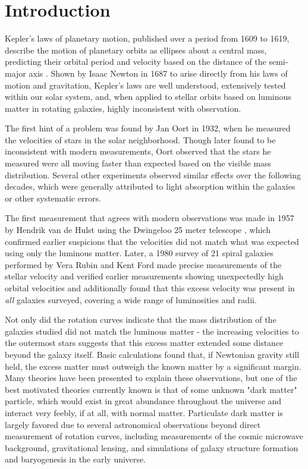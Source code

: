 \chapter{Introduction}
\label{intro_chapter}

Kepler's laws of planetary motion, published over a period from 1609 to 1619, describe the motion of planetary orbits as ellipses about a central mass, predicting their orbital period and velocity based on the distance of the semi-major axis \cite{kepler, russell}.
Shown by Isaac Newton in 1687 \cite{newton} to arise directly from his laws of motion and gravitation, Kepler's laws are well understood, extensively tested within our solar system, and, when applied to stellar orbits based on luminous matter in rotating galaxies, highly inconsistent with observation.

The first hint of a problem was found by Jan Oort in 1932, when he measured the velocities of stars in the solar neighborhood. 
Though later found to be inconsistent with modern measurements, Oort observed that the stars he measured were all moving faster than expected based on the visible mass distribution.
Several other experiments observed similar effects over the following decades, which were generally attributed to light absorption within the galaxies or other systematic errors.

The first measurement that agrees with modern observations was made in 1957 by Hendrik van de Hulst using the Dwingeloo 25 meter telescope \cite{deHulst}, which confirmed earlier suspicions that the velocities did not match what was expected using only the luminous matter.
Later, a 1980 survey of 21 spiral galaxies performed by Vera Rubin and Kent Ford \cite{RubinSurvey} made precise measurements of the stellar velocity and verified earlier measurements showing unexpectedly high orbital velocities and additionally found that this excess velocity was present in \textit{all} galaxies surveyed, covering a wide range of luminosities and radii.

Not only did the rotation curves indicate that the mass distribution of the galaxies studied did not match the luminous matter - the increasing velocities to the outermost stars suggests that this excess matter extended some distance beyond the galaxy itself. 
Basic calculations found that, if Newtonian gravity still held, the excess matter must outweigh the known matter by a significant margin. 
Many theories have been presented to explain these observations, but one of the best motivated theories currently known is that of some unknown "dark matter" particle, which would exist in great abundance throughout the universe and interact very feebly, if at all, with normal matter.
Particulate dark matter is largely favored due to several astronomical observations beyond direct measurement of rotation curves, including measurements of the cosmic microwave background, gravitational lensing, and simulations of galaxy structure formation and baryogenesis in the early universe.

